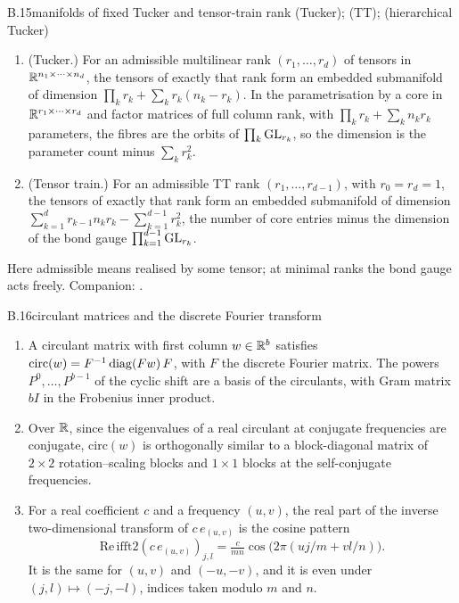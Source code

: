 \begin{auxresult}{B.15}{manifolds of fixed Tucker and tensor-train rank}{\citep{xkoch2010dynamical}
(Tucker); \citep{xholtz2012manifolds} (TT); \citep{xuschmajew2013geometry} (hierarchical Tucker)}
\begin{enumerate}[label=(\alph*)]
  \item (Tucker.) For an admissible multilinear rank $(r_1,\dots,r_d)$ of tensors in $\mathbb{R}^{n_1\times\dots\times n_d}$,
    the tensors of exactly that rank form an embedded submanifold of dimension $\prod_kr_k+\sum_kr_k(n_k-r_k)$. In the
    parametrisation by a core in $\mathbb{R}^{r_1\times\dots\times r_d}$ and factor matrices of full column rank, with
    $\prod_kr_k+\sum_kn_kr_k$ parameters, the fibres are the orbits of $\prod_k\mathrm{GL}_{r_k}$, so the dimension is the
    parameter count minus $\sum_kr_k^2$.
  \item (Tensor train.) For an admissible TT rank $(r_1,\dots,r_{d-1})$, with $r_0=r_d=1$, the tensors of exactly that
    rank form an embedded submanifold of dimension $\sum_{k=1}^dr_{k-1}n_kr_k-\sum_{k=1}^{d-1}r_k^2$, the number of core
    entries minus the dimension of the bond gauge $\prod_{k=1}^{d-1}\mathrm{GL}_{r_k}$.
\end{enumerate}
\end{auxresult}
\noindent Here admissible means realised by some tensor; at minimal ranks the bond gauge acts freely. Companion:
.

\begin{auxresult}{B.16}{circulant matrices and the discrete Fourier transform}{\citep[Thm~3.1]{xgray2006toeplitz}}
\begin{enumerate}[label=(\alph*)]
  \item A circulant matrix with first column $w\in\mathbb{R}^b$ satisfies $\mathrm{circ}(w)=F^{-1}\operatorname{diag}(Fw)\,F$, with $F$ the
    discrete Fourier matrix. The powers $P^0,\dots,P^{b-1}$ of the cyclic shift are a basis of the circulants, with Gram
    matrix $bI$ in the Frobenius inner product.
  \item Over $\mathbb{R}$, since the eigenvalues of a real circulant at conjugate frequencies are conjugate, $\mathrm{circ}(w)$ is
    orthogonally similar to a block-diagonal matrix of $2\times2$ rotation--scaling blocks and $1\times1$ blocks at the
    self-conjugate frequencies.
  \item For a real coefficient $c$ and a frequency $(u,v)$, the real part of the inverse two-dimensional transform of
    $c\,e_{(u,v)}$ is the cosine pattern
    \begin{equation*}
      \mathrm{Re}\,\mathrm{ifft2}(c\,e_{(u,v)})_{j,l}=\tfrac{c}{mn}\cos\big(2\pi(uj/m+vl/n)\big).
    \end{equation*}
    It is the same for $(u,v)$ and $(-u,-v)$, and it is even under $(j,l)\mapsto(-j,-l)$, indices taken modulo $m$
    and $n$.
\end{enumerate}
\end{auxresult}

